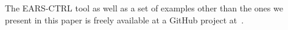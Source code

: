 The \textsf{EARS-CTRL} tool as well as a set of examples other than the ones we
present in this paper is freely available at a GitHub project
at~\cite{EARSProject}.

% 


